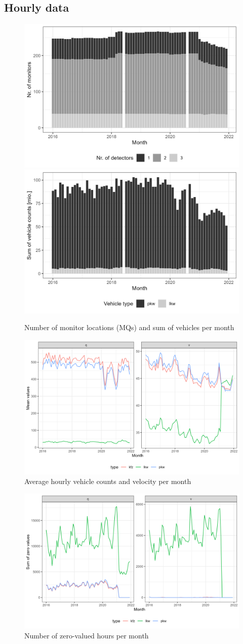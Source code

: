 \documentclass[a4paper, 10pt]{article}
\begin{document}
\clearpage\FloatBarrier
\subsection{Hourly data}
%
\begin{figure}[!htb]
\centering
\caption{Number of monitor locations (MQs) and sum of vehicles per month}
\includegraphics[width = .49\textwidth]{../04_figures/nrmonitors_per_yearmonth.png}
\includegraphics[width = .49\textwidth]{../04_figures/yearmonth_sum.png}
\end{figure}
%
\begin{figure}[!htb]
\centering
\caption{Average hourly vehicle counts and velocity per month}
\includegraphics[width = .65\textwidth]{../04_figures/yearmonth_avg.png}
\end{figure}
%
\begin{figure}[!htb]
\centering
\caption{Number of zero-valued hours per month}
\includegraphics[width = .65\textwidth]{../04_figures/yearmonth_zeros.png}
\end{figure}
\end{document}
